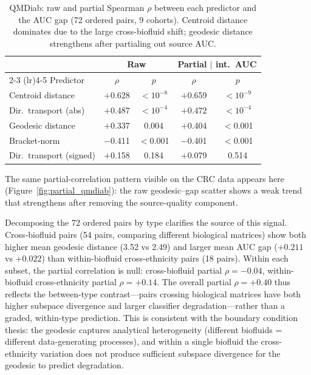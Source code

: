 \documentclass[11pt]{article}
\begin{document}
\begin{table}[t]
\centering
\caption{QMDiab: raw and partial Spearman $\rho$ between each predictor and the AUC gap (72 ordered pairs, 9 cohorts). Centroid distance dominates due to the large cross-biofluid shift; geodesic distance strengthens after partialing out source AUC.}
\label{tab:qmdiab}
\begin{tabular}{lcccc}
\toprule
 & \multicolumn{2}{c}{Raw} & \multicolumn{2}{c}{Partial $|$ int.\ AUC} \\
\cmidrule(lr){2-3} \cmidrule(lr){4-5}
Predictor & $\rho$ & $p$ & $\rho$ & $p$ \\
\midrule
Centroid distance        & $+$0.628 & $<10^{-8}$ & $+$0.659 & $<10^{-9}$ \\
Dir.\ transport (abs)    & $+$0.487 & $<10^{-4}$ & $+$0.472 & $<10^{-4}$ \\
Geodesic distance        & $+$0.337 & 0.004      & $+$0.404 & $<$0.001 \\
Bracket-norm             & $-$0.411 & $<$0.001   & $-$0.401 & $<$0.001 \\
Dir.\ transport (signed) & $+$0.158 & 0.184      & $+$0.079 & 0.514 \\
\bottomrule
\end{tabular}
\end{table}

The same partial-correlation pattern visible on the CRC data appears here (Figure~\ref{fig:partial_qmdiab}): the raw geodesic--gap scatter shows a weak trend that strengthens after removing the source-quality component.

Decomposing the 72 ordered pairs by type clarifies the source of this signal. Cross-biofluid pairs (54 pairs, comparing different biological matrices) show both higher mean geodesic distance (3.52 vs 2.49) and larger mean AUC gap ($+0.211$ vs $+0.022$) than within-biofluid cross-ethnicity pairs (18 pairs). Within each subset, the partial correlation is null: cross-biofluid partial $\rho = -0.04$, within-biofluid cross-ethnicity partial $\rho = +0.14$. The overall partial $\rho = +0.40$ thus reflects the between-type contrast---pairs crossing biological matrices have both higher subspace divergence and larger classifier degradation---rather than a graded, within-type prediction. This is consistent with the boundary condition thesis: the geodesic captures analytical heterogeneity (different biofluids = different data-generating processes), and within a single biofluid the cross-ethnicity variation does not produce sufficient subspace divergence for the geodesic to predict degradation.
\end{document}
